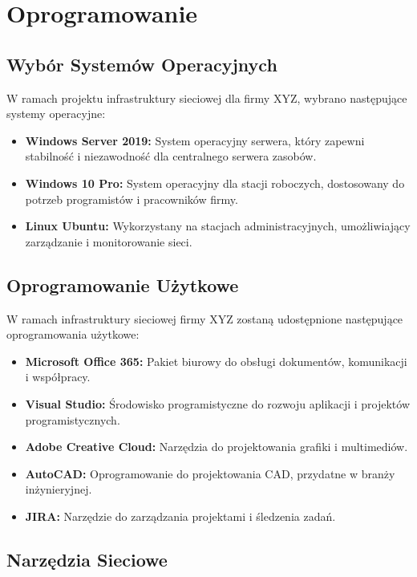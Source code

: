 \section{Oprogramowanie}

\subsection{Wybór Systemów Operacyjnych}

    W ramach projektu infrastruktury sieciowej dla firmy XYZ, wybrano następujące systemy operacyjne:

    \begin{itemize}
    \item \textbf{Windows Server 2019:} System operacyjny serwera, który zapewni stabilność i niezawodność dla centralnego serwera zasobów.
    \item \textbf{Windows 10 Pro:} System operacyjny dla stacji roboczych, dostosowany do potrzeb programistów i pracowników firmy.
    \item \textbf{Linux Ubuntu:} Wykorzystany na stacjach administracyjnych, umożliwiający zarządzanie i monitorowanie sieci.
    \end{itemize}

\subsection{Oprogramowanie Użytkowe}

    W ramach infrastruktury sieciowej firmy XYZ zostaną udostępnione następujące oprogramowania użytkowe:

    \begin{itemize}
    \item \textbf{Microsoft Office 365:} Pakiet biurowy do obsługi dokumentów, komunikacji i współpracy.
    \item \textbf{Visual Studio:} Środowisko programistyczne do rozwoju aplikacji i projektów programistycznych.
    \item \textbf{Adobe Creative Cloud:} Narzędzia do projektowania grafiki i multimediów.
    \item \textbf{AutoCAD:} Oprogramowanie do projektowania CAD, przydatne w branży inżynieryjnej.
    \item \textbf{JIRA:} Narzędzie do zarządzania projektami i śledzenia zadań.
    \end{itemize}

\subsection{Narzędzia Sieciowe}

